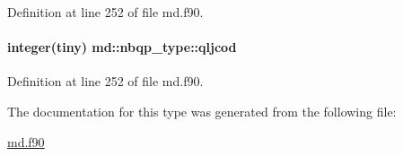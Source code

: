 Definition at line 252 of file md.\-f90.

\hypertarget{structmd_1_1nbqp__type_a4f100f69a7bf4c40d87f173ac025ccdc}{
\paragraph[{qljcod}]{\setlength{\rightskip}{0pt plus 5cm}integer(tiny) md\-::nbqp\-\_\-type\-::qljcod}}\label{structmd_1_1nbqp__type_a4f100f69a7bf4c40d87f173ac025ccdc}


Definition at line 252 of file md.\-f90.



The documentation for this type was generated from the following file\-:\begin{DoxyCompactItemize}
\item 
\hyperlink{md_8f90}{md.\-f90}\end{DoxyCompactItemize}
